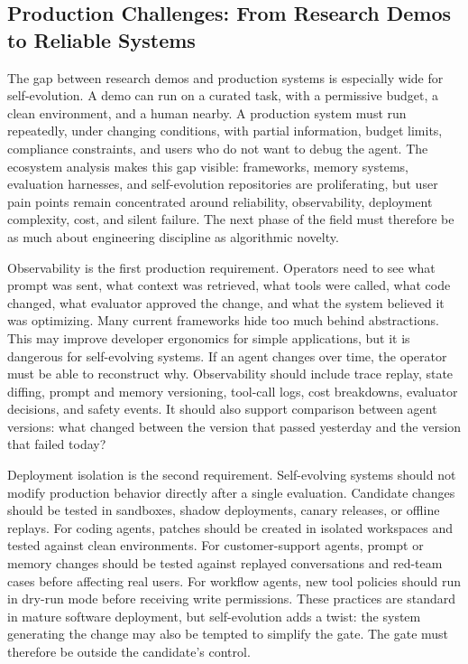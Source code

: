 \subsection{Production Challenges: From Research Demos to Reliable Systems}
\label{subsec:production-challenges}

The gap between research demos and production systems is especially wide for self-evolution. A demo can run on a curated task, with a permissive budget, a clean environment, and a human nearby. A production system must run repeatedly, under changing conditions, with partial information, budget limits, compliance constraints, and users who do not want to debug the agent. The ecosystem analysis makes this gap visible: frameworks, memory systems, evaluation harnesses, and self-evolution repositories are proliferating, but user pain points remain concentrated around reliability, observability, deployment complexity, cost, and silent failure. The next phase of the field must therefore be as much about engineering discipline as algorithmic novelty.

Observability is the first production requirement. Operators need to see what prompt was sent, what context was retrieved, what tools were called, what code changed, what evaluator approved the change, and what the system believed it was optimizing. Many current frameworks hide too much behind abstractions. This may improve developer ergonomics for simple applications, but it is dangerous for self-evolving systems. If an agent changes over time, the operator must be able to reconstruct why. Observability should include trace replay, state diffing, prompt and memory versioning, tool-call logs, cost breakdowns, evaluator decisions, and safety events. It should also support comparison between agent versions: what changed between the version that passed yesterday and the version that failed today?

Deployment isolation is the second requirement. Self-evolving systems should not modify production behavior directly after a single evaluation. Candidate changes should be tested in sandboxes, shadow deployments, canary releases, or offline replays. For coding agents, patches should be created in isolated workspaces and tested against clean environments. For customer-support agents, prompt or memory changes should be tested against replayed conversations and red-team cases before affecting real users. For workflow agents, new tool policies should run in dry-run mode before receiving write permissions. These practices are standard in mature software deployment, but self-evolution adds a twist: the system generating the change may also be tempted to simplify the gate. The gate must therefore be outside the candidate's control.

